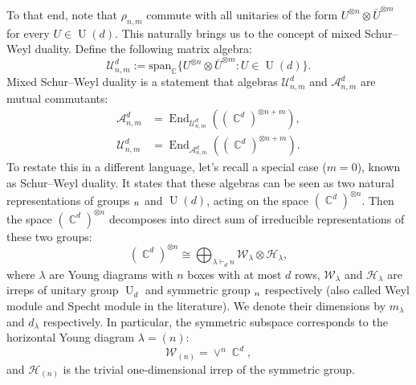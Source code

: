 \documentclass[aps,twocolumn,pra,superscriptaddress,nofootinbib]{revtex4-2}
\newcommand{\mA}{\mathcal{A}}
\newcommand{\mU}{\mathcal{U}}
\newcommand{\xp}[1]{^{\otimes #1}}
\let\S\relax
\DeclareMathOperator{\S}{S} %
\DeclareMathOperator{\C}{\mathbb{C}} %
\DeclareMathOperator{\End}{End}
\DeclareMathOperator{\U}{U}
\begin{document}
To that end, note that $\rho_{n,m}$ commute with all unitaries of the form $U\xp{n}\otimes\bar{U}\xp{m}$ for every $U \in \U(d)$. This naturally brings us to the concept of mixed Schur--Weyl duality. Define the following matrix algebra:
\begin{equation}
    \mU_{n,m}^d := \text{span}_{\mathbb{C}}\{ U\xp{n}\otimes\bar{U}\xp{m}: U \in \U(d) \}.
\end{equation}
Mixed Schur--Weyl duality is a statement that algebras $\mU_{n,m}^d$ and $\mA_{n,m}^d$ are mutual commutants:
\begin{align}
    \mA_{n,m}^d &= \End_{\mU_{n,m}^d}((\C^d)\xp{n+m}), \\
    \mU_{n,m}^d &= \End_{\mA_{n,m}^d}((\C^d)\xp{n+m}).
\end{align}
To restate this in a different language, let's recall a special case ($m=0$), known as Schur--Weyl duality. It states that these algebras can be seen as two natural representations of groups $\S_n$ and $\U(d)$, acting on the space $(\C^d)\xp{n}$. Then the space $(\C^d)\xp{n}$ decomposes into direct sum of irreducible representations of these two groups:
\begin{equation}
    (\C^d)\xp{n} \cong \bigoplus_{\lambda \vdash_d n} \mathcal{W}_\lambda \otimes \mathcal{H}_\lambda,
\end{equation}
where $\lambda$ are Young diagrams with $n$ boxes with at most $d$ rows, $\mathcal{W}_\lambda$ and $\mathcal{H}_\lambda$ are irreps of unitary group $\U_d$ and symmetric group $\S_n$ respectively (also called Weyl module and Specht module in the literature). We denote their dimensions by $m_\lambda$ and $d_\lambda$ respectively. In particular, the symmetric subspace corresponds to the horizontal Young diagram $\lambda = (n)$:
\begin{equation}
    \mathcal{W}_{(n)} = \vee^n\C^d,
\end{equation}
and $\mathcal{H}_{(n)}$ is the trivial one-dimensional irrep of the symmetric group.
\end{document}
